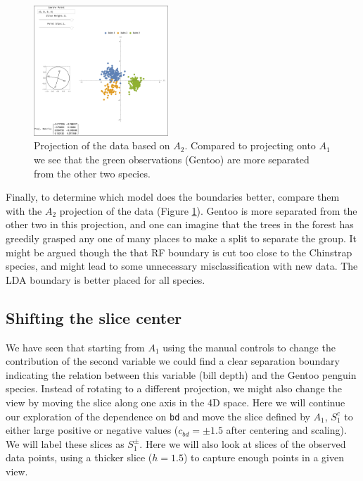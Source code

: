 \documentclass[]{interact}
\theoremstyle{plain}%
\theoremstyle{definition}
\theoremstyle{remark}
\begin{document}
\begin{figure}[ht]
\centerline{\includegraphics[width=0.45\textwidth]{figures/proj2_data.png}}
\caption{Projection of the data based on $A_2$. Compared to projecting onto $A_1$ we see that the green observations (Gentoo) are more separated from the other two species.}
\label{proj2}
\end{figure}

Finally, to determine which model does the boundaries better, compare
them with the \(A_2\) projection of the data (Figure \ref{proj2}).
Gentoo is more separated from the other two in this projection, and one
can imagine that the trees in the forest has greedily grasped any one of
many places to make a split to separate the group. It might be argued
though the that RF boundary is cut too close to the Chinstrap species,
and might lead to some unnecessary misclassification with new data. The
LDA boundary is better placed for all species.

\hypertarget{shifting-the-slice-center}{%
\subsection{Shifting the slice center}\label{shifting-the-slice-center}}

We have seen that starting from \(A_1\) using the manual controls to
change the contribution of the second variable we could find a clear
separation boundary indicating the relation between this variable (bill
depth) and the Gentoo penguin species. Instead of rotating to a
different projection, we might also change the view by moving the slice
along one axis in the 4D space. Here we will continue our exploration of
the dependence on \texttt{bd} and move the slice defined by \(A_1\),
\(S_1^c\) to either large positive or negative values
(\(c_{bd} = \pm 1.5\) after centering and scaling). We will label these
slices as \(S_1^{\pm}\). Here we will also look at slices of the
observed data points, using a thicker slice (\(h=1.5\)) to capture
enough points in a given view.
\end{document}
